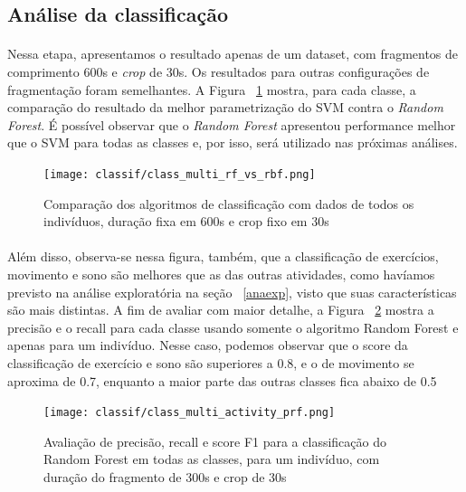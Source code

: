         \subsection{Análise da classificação}
        
            \paragraph{} Nessa etapa, apresentamos o resultado apenas de um dataset, com fragmentos de comprimento 600s e \textit{crop} de 30s. Os resultados para outras configurações de fragmentação foram semelhantes. A Figura ~\ref{svmvsrf} mostra, para cada classe, a comparação do resultado da melhor parametrização do SVM contra o \textit{Random Forest}. É possível observar que o \textit{ Random Forest} apresentou performance melhor que o SVM para todas as classes e, por isso, será utilizado nas próximas análises. 
            
            \begin{figure}[h!]
            	\centering
            	\texttt{[image: classif/class\_multi\_rf\_vs\_rbf.png]}
            	\caption{Comparação dos algoritmos de classificação com dados de todos os indivíduos, duração fixa em 600s e crop fixo em 30s}
                \label{svmvsrf}
            \end{figure}
            
            \paragraph{} Além disso, observa-se nessa figura, também, que a classificação de exercícios, movimento e sono são melhores que as das outras atividades, como havíamos previsto na análise exploratória na seção ~\ref{anaexp}, visto que suas características são mais distintas. A fim de avaliar com maior detalhe, a Figura ~\ref{multiclass_prf} mostra a precisão e o recall para cada classe usando somente o algoritmo Random Forest e apenas para um indivíduo. Nesse caso, podemos observar que o score da classificação de exercício e sono são superiores a 0.8, e o de movimento se aproxima de 0.7, enquanto a maior parte das outras classes fica abaixo de 0.5
            
            \begin{figure}[h!]
            	\centering
            	\texttt{[image: classif/class\_multi\_activity\_prf.png]}
            	\caption{Avaliação de precisão, recall e score F1 para a classificação do Random Forest em todas as classes, para um indivíduo, com duração do fragmento de 300s e crop de 30s}
                \label{multiclass_prf}
            \end{figure}
            
